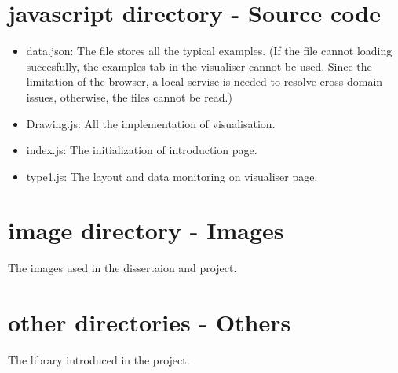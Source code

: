 \section{javascript \textbf{directory} - \textbf{Source code}}
\label{sec:Appendix:js}
\begin{itemize}
    \item data.json: The file stores all the typical examples. (If the file cannot loading succesfully, the examples tab in the visualiser cannot be used. Since the limitation of the browser, a local servise is needed to resolve cross-domain issues, otherwise, the files cannot be read.)
    \item Drawing.js: All the implementation of visualisation.
    \item index.js: The initialization of introduction page.
    \item type1.js: The layout and data monitoring on visualiser page.
\end{itemize}

\section{image \textbf{directory} - \textbf{Images}}
\label{sec:Appendix:image}
The images used in the dissertaion and project.

\section{other \textbf{directories} - \textbf{Others}}
\label{sec:Appendix:other}
The library introduced in the project.